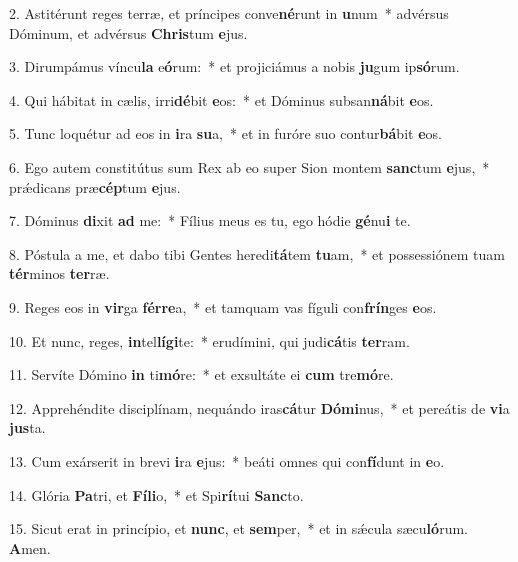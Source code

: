2. Astitérunt reges terræ, et príncipes conve\textbf{né}runt in \textbf{u}num~*  advérsus Dóminum, et advérsus \textbf{Chris}tum \textbf{e}jus.\

3. Dirumpámus víncu\textbf{la} e\textbf{ó}rum:~*  et projiciámus a nobis \textbf{ju}gum ip\textbf{só}rum.\

4. Qui hábitat in cælis, irri\textbf{dé}bit \textbf{e}os:~*  et Dóminus subsan\textbf{ná}bit \textbf{e}os.\

5. Tunc loquétur ad eos in \textbf{i}ra \textbf{su}a,~*  et in furóre suo contur\textbf{bá}bit \textbf{e}os.\

6. Ego autem constitútus sum Rex ab eo super Sion montem \textbf{sanc}tum \textbf{e}jus,~*  prǽdicans præ\textbf{cép}tum \textbf{e}jus.\

7. Dóminus \textbf{di}xit \textbf{ad} me:~*  Fílius meus es tu, ego hódie \textbf{gé}nu\textbf{i} te.\

8. Póstula a me, et dabo tibi Gentes heredi\textbf{tá}tem \textbf{tu}am,~*  et possessiónem tuam \textbf{tér}minos \textbf{ter}ræ.\

9. Reges eos in \textbf{vir}ga \textbf{fér}\textbf{re}a,~*  et tamquam vas fíguli con\textbf{frín}ges \textbf{e}os.\

10. Et nunc, reges, \textbf{in}tel\textbf{lí}\textbf{gi}te:~*  erudímini, qui judi\textbf{cá}tis \textbf{ter}ram.\

11. Servíte Dómino \textbf{in} ti\textbf{mó}re:~*  et exsultáte ei \textbf{cum} tre\textbf{mó}re.\

12. Apprehéndite disciplínam, nequándo iras\textbf{cá}tur \textbf{Dó}\textbf{mi}nus,~*  et pereátis de \textbf{vi}a \textbf{jus}ta.\

13. Cum exárserit in brevi \textbf{i}ra \textbf{e}jus:~*  beáti omnes qui con\textbf{fí}dunt in \textbf{e}o.\

14. Glória \textbf{Pa}tri, et \textbf{Fí}\textbf{li}o,~*  et Spi\textbf{rí}tui \textbf{Sanc}to.\

15. Sicut erat in princípio, et \textbf{nunc}, et \textbf{sem}per,~*  et in sǽcula sæcu\textbf{ló}rum. \textbf{A}men.\

